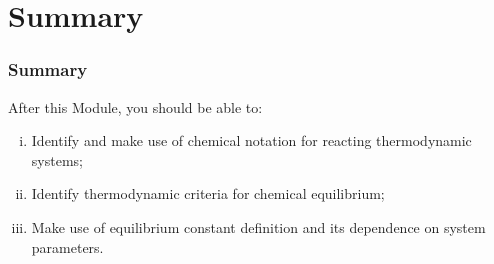 \documentclass[10pt,compress,handout,unknownkeysallowed]{beamer}
\begin{document}
\section{Summary}

\begin{frame}
 \frametitle{Summary}
   After this Module, you should be able to:
   \begin{enumerate}[(i)]
     \item Identify and make use of chemical notation for reacting thermodynamic systems;
     \item Identify thermodynamic criteria for chemical equilibrium;
     \item Make use of equilibrium constant definition and its dependence on system parameters.
   \end{enumerate}
\end{frame}
\end{document}
